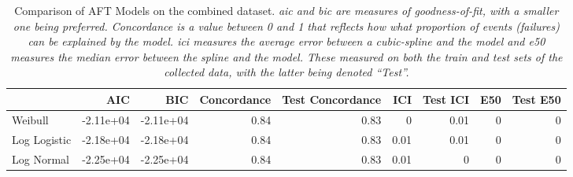 \documentclass[conference]{IEEEtran}
\newcommand{\cm}[1]{\textit{{\color{blue}#1}}}
\begin{document}
\begin{table}
\centering
\caption{Comparison of AFT Models on the combined dataset. \cm{\acrshort{aic} and \acrshort{bic} are measures of goodness-of-fit, with a smaller one being preferred. Concordance is a value between 0 and 1 that reflects how what proportion of events (failures) can be explained by the model. \acrshort{ici} measures the average error between a cubic-spline and the model and \acrshort{e50} measures the median error between the spline and the model. These measured on both the train and test sets of the collected data, with the latter being denoted ``Test''.}}
\label{tab:combined}
\begin{tabular}{lrrrrrrrr}
\toprule
 & AIC & BIC & Concordance & Test Concordance & ICI & Test ICI & E50 & Test E50 \\
\midrule
Weibull & -2.11e+04 & -2.11e+04 & 0.84 & 0.83 & 0 & 0.01 & 0 & 0 \\
Log Logistic & -2.18e+04 & -2.18e+04 & 0.84 & 0.83 & 0.01 & 0.01 & 0 & 0 \\
Log Normal & -2.25e+04 & -2.25e+04 & 0.84 & 0.83 & 0.01 & 0 & 0 & 0 \\
\bottomrule
\end{tabular}
\end{table}
\end{document}

